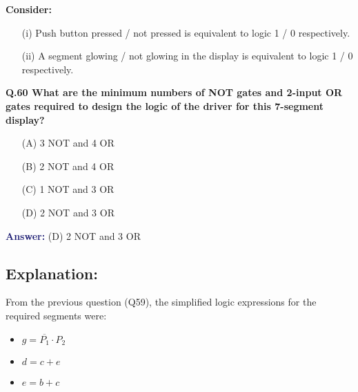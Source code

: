 \documentclass[a4paper,12pt]{article}
\begin{document}
\begin{center}
\end{center}

\vspace{0.5cm}

\textbf{Consider:}
\begin{itemize}
    \item[(i)] Push button pressed / not pressed is equivalent to logic 1 / 0 respectively.
    \item[(ii)] A segment glowing / not glowing in the display is equivalent to logic 1 / 0 respectively.
\end{itemize}
\noindent
\textbf{Q.60 What are the minimum numbers of NOT gates and 2-input OR gates required to design the logic of the driver for this 7-segment display? }

\vspace{1em}
\begin{itemize}
    \item[(A)] 3 NOT and 4 OR
    \item[(B)] 2 NOT and 4 OR
    \item[(C)] 1 NOT and 3 OR
    \item[(D)] 2 NOT and 3 OR
\end{itemize}

\vspace{1em}
\noindent\textcolor{MidnightBlue}{\textbf{Answer:}} (D) 2 NOT and 3 OR
\newpage
\pagestyle{empty}
\subsection*{Explanation:}
From the previous question (Q59), the simplified logic expressions for the required segments were:
\begin{itemize}
    \item $g = \overline{P_1} \cdot P_2$
    \item $d = c + e$
    \item $e = b + c$
\end{itemize}
\end{document}
